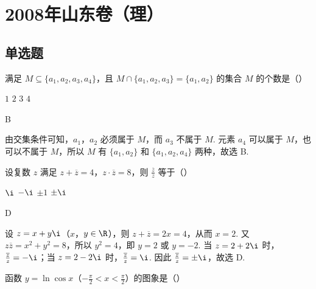 
\chapter{2008年山东卷（理）}

\section{单选题}

\begin{problem}
满足 \(M \subseteq \{a_1, a_2, a_3, a_4\}\)，且 \(M \cap \{a_1, a_2, a_3\} = \{a_1, a_2\}\) 的集合 \(M\) 的个数是（\quad）

\choices
    {\(1\)}
    {\(2\)}
    {\(3\)}
    {\(4\)}
\end{problem}

\begin{answer}
B
\end{answer}

\begin{solution}
由交集条件可知，\(a_1\)，\(a_2\) 必须属于 \(M\)，而 \(a_3\) 不属于 \(M\). 元素 \(a_4\) 可以属于 \(M\)，也可以不属于 \(M\)，所以 \(M\) 有 \(\{a_1,a_2\}\) 和 \(\{a_1,a_2,a_4\}\) 两种，故选 B.
\end{solution}

\begin{problem}
设复数 \(z\) 满足 \(z + \overline{z} = 4\)，\(z \cdot \overline{z} = 8\)，则 \(\frac{\overline{z}}{z}\) 等于（\quad）

\choices
    {\(\i\)}
    {\(-\i\)}
    {\(\pm 1\)}
    {\(\pm \i\)}
\end{problem}

\begin{answer}
D
\end{answer}

\begin{solution}
设 \(z=x+y\i\)（\(x\)，\(y\in\R\)），则 \(z+\overline z=2x=4\)，从而 \(x=2\). 又 \(z\overline z=x^2+y^2=8\)，所以 \(y^2=4\)，即 \(y=2\) 或 \(y=-2\). 当 \(z=2+2\i\) 时，\(\frac{\overline z}{z}=-\i\)；当 \(z=2-2\i\) 时，\(\frac{\overline z}{z}=\i\). 因此 \(\frac{\overline z}{z}=\pm\i\)，故选 D.
\end{solution}

\begin{problem}
函数 \(y = \ln \cos x\)（\(-\frac{\pi}{2} < x < \frac{\pi}{2}\)）的图象是（\quad）

    {}
    {}
    {}
\end{problem}


